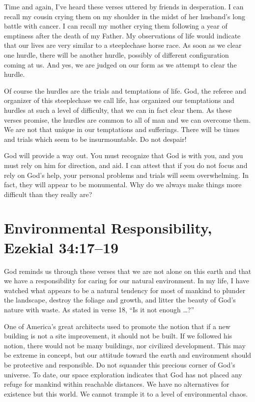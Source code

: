 \documentclass[12pt]{memoir}
\begin{document}
Time and again, I've heard these verses uttered by friends in desperation.
I can recall my cousin crying them on my shoulder in the midst of
her husband's long battle with cancer. I can recall my mother crying
them following a year of emptiness after the death of my Father. My
observations of life would indicate that our lives are very similar
to a steeplechase horse race. As soon as we clear one hurdle, there will be another hurdle, possibly of different configuration coming
at us. And yes, we are judged on our form as we attempt to clear
the hurdle.

Of course the hurdles are the trials and temptations of life. God,
the referee and organizer of this steeplechase we call life,
has organized our temptations and hurdles at such a level of difficulty,
that we can in fact clear them. As these verses promise, the hurdles
are common to all of man and we can overcome them. We are not that
unique in our temptations and sufferings. There will be times and
trials which seem to be insurmountable. Do not despair!

God will provide a way out. You must recognize that God is with you,
and you must rely on him for direction, and aid. I can
attest that if you do not focus and rely on God's help, your personal
problems and trials will seem overwhelming. In fact, they will appear
to be monumental. Why do we always make things more difficult than
they really are?

\section[Environmental Responsibility]{Environmental Responsibility, Ezekial 34:17--19}

God reminds us through these verses that we are not alone on this
earth and that we have a responsibility for caring for our natural environment.
In my life, I have watched what appears to be a natural tendency for
most of mankind to plunder the landscape, destroy the foliage and
growth, and litter the beauty of God's nature with waste. As stated
in verse 18, ``Is it not enough \dots ?''

One of America's great architects used to promote the notion that
if a new building is not a site improvement, it should not be built.
If we followed his notion, there would not be many buildings, nor
civilized development. This may be extreme in concept, but our attitude
toward the earth and environment should be protective and responsible.
Do not squander this precious corner of God's universe. To date,
our space exploration indicates that God has not placed any refuge
for mankind within reachable distances. We have no alternatives for
existence but this world. We cannot trample it to a level of
environmental chaos.
\end{document}
